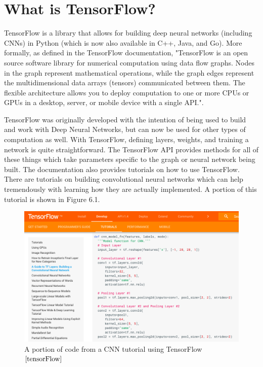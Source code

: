 \documentclass[12pt]{report} %
\begin{document}
\section{What is TensorFlow?}
	TensorFlow is a library that allows for building deep neural networks (including CNNs) in Python (which is now also available in C++, Java, and Go). More formally, as defined in the TensorFlow documentation,  "TensorFlow is an open source software library for numerical computation using data flow graphs. Nodes in the graph represent mathematical operations, while the graph edges represent the multidimensional data arrays (tensors) communicated between them. The flexible architecture allows you to deploy computation to one or more CPUs or GPUs in a desktop, server, or mobile device with a single API."\cite{tensorFlow}.
	
	TensorFlow was originally developed with the intention of being used to build and work with Deep Neural Networks, but can now be used for other types of computation as well. With TensorFlow, defining layers, weights, and training a network is quite straightforward. The TensorFlow API provides methods for all of these things which take parameters specific to the graph or neural network being built. The documentation also provides tutorials on how to use TensorFlow. There are tutorials on building convolutional neural networks which can help tremendously with learning how they are actually implemented. A portion of this tutorial is shown in Figure 6.1\cite{tensorFlow}.
\begin{figure}
\centering
\includegraphics[width=5in]{tensorflow_cnn}
\caption{A portion of code from a  CNN tutorial using TensorFlow$\cite{tensorFlow}$}
\end{figure}	
\end{document}
